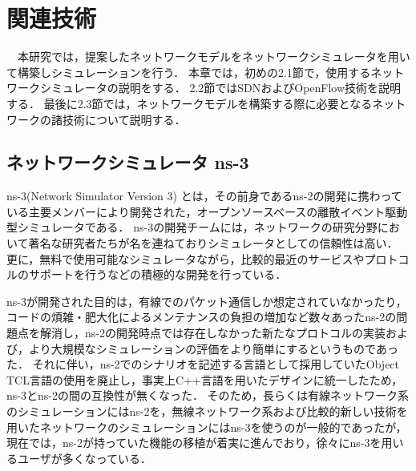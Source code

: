 \chapter{関連技術}

　本研究では，提案したネットワークモデルをネットワークシミュレータを用いて構築しシミュレーションを行う．
本章では，初めの2.1節で，使用するネットワークシミュレータの説明をする．
2.2節ではSDNおよびOpenFlow技術を説明する．
最後に2.3節では，ネットワークモデルを構築する際に必要となるネットワークの諸技術について説明する．

\section{ネットワークシミュレータ ns-3}

ns-3(Network Simulator Version 3)\cite{ns3} \cite{ns3text} とは，その前身であるns-2の開発に携わっている主要メンバーにより開発された，オープンソースベースの離散イベント駆動型シミュレータである．
ns-3の開発チームには，ネットワークの研究分野において著名な研究者たちが名を連ねておりシミュレータとしての信頼性は高い．
更に，無料で使用可能なシミュレータながら，比較的最近のサービスやプロトコルのサポートを行うなどの積極的な開発を行っている．

ns-3が開発された目的は，有線でのパケット通信しか想定されていなかったり，コードの煩雑・肥大化によるメンテナンスの負担の増加など数々あったns-2の問題点を解消し，ns-2の開発時点では存在しなかった新たなプロトコルの実装および，より大規模なシミュレーションの評価をより簡単にするというものであった．
それに伴い，ns-2でのシナリオを記述する言語として採用していたObject TCL言語の使用を廃止し，事実上C++言語を用いたデザインに統一したため，ns-3とns-2の間の互換性が無くなった．
そのため，長らくは有線ネットワーク系のシミュレーションにはns-2を，無線ネットワーク系および比較的新しい技術を用いたネットワークのシミュレーションにはns-3を使うのが一般的であったが，現在では，ns-2が持っていた機能の移植が着実に進んでおり，徐々にns-3を用いるユーザが多くなっている． \\

